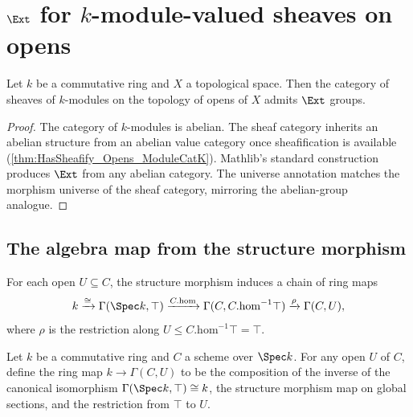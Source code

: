 \section{\(\Ext\) for \(k\)-module-valued sheaves on opens}
\label{sec:moduleK_ext}

\begin{theorem}
  \label{thm:HasExt_Sheaf_Opens_ModuleCatK}

  Let \(k\) be a commutative ring and \(X\) a topological space. Then the category of sheaves of \(k\)-modules on the topology of opens of \(X\) admits \(\Ext\) groups.
\end{theorem}

\begin{proof}

\leanok
  The category of \(k\)-modules is abelian. The sheaf category inherits an abelian structure from an abelian value category once sheafification is available (\cref{thm:HasSheafify_Opens_ModuleCatK}). Mathlib's standard construction produces \(\Ext\) from any abelian category. The universe annotation matches the morphism universe of the sheaf category, mirroring the abelian-group analogue.
\end{proof}

\subsection{The algebra map from the structure morphism}

For each open \(U \subseteq C\), the structure morphism induces a chain of ring maps
\[
  k \xrightarrow{\cong} \Gamma(\Spec k, \top) \xrightarrow{C.\mathrm{hom}} \Gamma(C, C.\mathrm{hom}^{-1}\top) \xrightarrow{\rho} \Gamma(C, U),
\]
where \(\rho\) is the restriction along \(U \le C.\mathrm{hom}^{-1}\top = \top\).

\begin{definition}
  \label{def:Scheme_kToSection}
  
  Let \(k\) be a commutative ring and \(C\) a scheme over \(\Spec k\). For any open \(U\) of \(C\), define the ring map \(k \to \Gamma(C, U)\) to be the composition of the inverse of the canonical isomorphism \(\Gamma(\Spec k, \top) \cong k\), the structure morphism map on global sections, and the restriction from \(\top\) to \(U\).
\end{definition}

